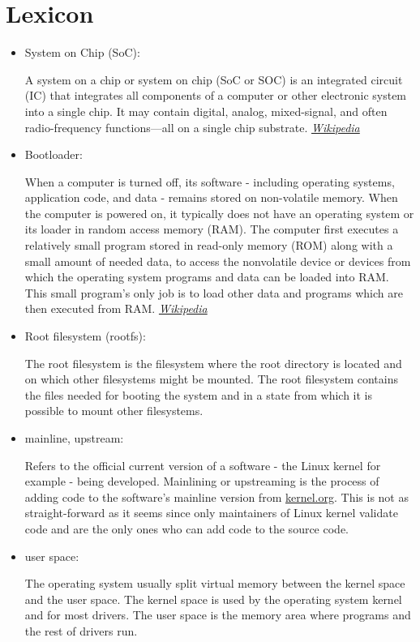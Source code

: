 \chapter*{Lexicon}

\begin{itemize}
\item System on Chip (SoC):

A system on a chip or system on chip (SoC or SOC) is an integrated circuit (IC) that integrates all components of a computer or other electronic system into a single chip. It may contain digital, analog, mixed-signal, and often radio-frequency functions—all on a single chip substrate. \href{https://en.wikipedia.org/wiki/System\_on\_a\_chip}{\textit{Wikipedia}}

\item Bootloader:

When a computer is turned off, its software - including operating systems, application code, and data - remains stored on non-volatile memory. When the computer is powered on, it typically does not have an operating system or its loader in random access memory (RAM). The computer first executes a relatively small program stored in read-only memory (ROM) along with a small amount of needed data, to access the nonvolatile device or devices from which the operating system programs and data can be loaded into RAM. This small program's only job is to load other data and programs which are then executed from RAM. \href{https://en.wikipedia.org/wiki/Booting\#BOOT-LOADER}{\textit{Wikipedia}}

\item Root filesystem (rootfs):

The root filesystem is the filesystem where the root directory is located and on which other filesystems might be mounted. The root filesystem contains the files needed for booting the system and in a state from which it is possible to mount other filesystems.

\item mainline, upstream:

Refers to the official current version of a software - the Linux kernel for example - being developed. Mainlining or upstreaming is the process of adding code to the software's mainline version from \url{kernel.org}. This is not as straight-forward as it seems since only maintainers of Linux kernel validate code and are the only ones who can add code to the source code.

\item user space:

The operating system usually split virtual memory between the kernel space and the user space. The kernel space is used by the operating system kernel and for most drivers. The user space is the memory area where programs and the rest of drivers run.

\end{itemize}
